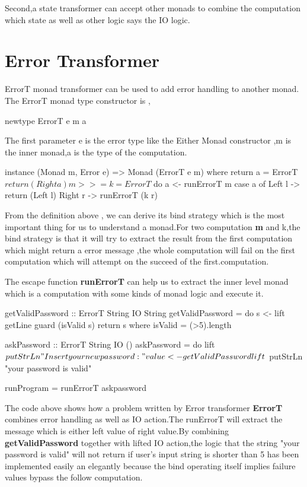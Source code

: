 Second,a state transformer can accept other monads to combine the computation which state as well as other logic says the IO logic.


\section{Error Transformer}
ErrorT monad transformer can be used to add error handling to another monad.
The ErrorT monad type constructor is ,
\begin{hcode}
newtype ErrorT e m a
\end{hcode}
The first parameter e is the error type like the Either Monad constructor ,m is the inner monad,a is the type of the computation.

\begin{hcode}
instance (Monad m, Error e) => Monad (ErrorT e m) where
    return a = ErrorT $ return (Right a)
    m >>= k  = ErrorT $ do
        a <- runErrorT m
        case a of
            Left  l -> return (Left l)
            Right r -> runErrorT (k r)
\end{hcode}

From the definition above , we can derive its bind strategy which is the most important thing for us to understand a monad.For two computation \textbf{m} and {k},the bind strategy is  that it will try to extract the result from the first computation which might return a error message ,the whole computation will fail on the first computation which will attempt on the succeed of the first.computation.

The escape function \textbf{runErrorT} can help us to extract the inner level monad which is a computation with some kinds of monad logic and execute it.


\begin{hcode}
getValidPassword :: ErrorT String IO String
getValidPassword = do s <- lift getLine
                      guard (isValid s)
                      return s
                      	where isValid = (>5).length
 
askPassword :: ErrorT String IO ()
askPassword = do lift $ putStrLn "Insert your new password:"
                 value <- getValidPassword
                 lift $ putStrLn "your password is valid"
                              
runProgram = runErrorT askpassword                
\end{hcode}

The code above shows how a problem written by Error transformer \textbf{ErrorT} combines error handling as well as IO action.The runErrorT will extract the message which is either left value of right value.By combining\\ \textbf{getValidPassword} together with lifted IO action,the logic that the string "your password is valid" will not return if user's input string is shorter than 5 has been implemented easily an elegantly because the bind operating itself implies failure values bypass the follow computation.

